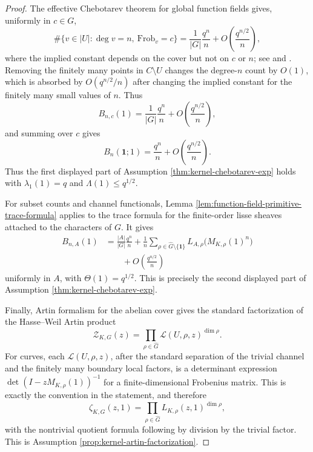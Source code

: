 \documentclass[12pt,a4paper]{article}
\theoremstyle{plain}
\theoremstyle{definition}
\numberwithin{equation}{section}
\newcommand{\ind}{\mathbf{1}}
\begin{document}
\begin{proof}
The effective Chebotarev theorem for global function fields gives, uniformly in \(c\in G\),
\[
\#\{v\in |U|:\deg v=n,\ \mathrm{Frob}_v=c\}
=
\frac{1}{|G|}\frac{q^n}{n}+O\!\left(\frac{q^{n/2}}{n}\right),
\]
where the implied constant depends on the cover but not on \(c\) or \(n\); see \cite[Chapter 9]{Rosen2002} and \cite{Ishibashi1992}. Removing the finitely many points in \(C\setminus U\) changes the degree-\(n\) count by \(O(1)\), which is absorbed by \(O(q^{n/2}/n)\) after changing the implied constant for the finitely many small values of \(n\). Thus
\[
B_{n,c}(1)
=
\frac{1}{|G|}\frac{q^n}{n}
+O\!\left(\frac{q^{n/2}}{n}\right),
\]
and summing over \(c\) gives
\[
B_n(\ind;1)
=
\frac{q^n}{n}+O\!\left(\frac{q^{n/2}}{n}\right).
\]
Thus the first displayed part of Assumption \ref{thm:kernel-chebotarev-exp} holds with \(\lambda_1(1)=q\) and \(\Lambda(1)\le q^{1/2}\).

For subset counts and channel functionals, Lemma \ref{lem:function-field-primitive-trace-formula} applies to the trace formula for the finite-order lisse sheaves attached to the characters of \(G\). It gives
\[
\begin{aligned}
B_{n,A}(1)
&=\frac{|A|}{|G|}\frac{q^n}{n}
+\frac1n\sum_{\rho\in\widehat G\setminus\{\ind\}}
L_{A,\rho}\!\bigl(M_{K,\rho}(1)^n\bigr)\\
&\qquad +O\!\left(\frac{q^{n/2}}{n}\right)
\end{aligned}
\]
uniformly in \(A\), with \(\Theta(1)=q^{1/2}\). This is precisely the second displayed part of Assumption \ref{thm:kernel-chebotarev-exp}.

Finally, Artin formalism for the abelian cover gives the standard factorization of the Hasse--Weil Artin product
\[
\mathcal Z_{K,G}(z)=\prod_{\rho\in\widehat G}\mathcal L(U,\rho,z)^{\dim\rho}.
\]
For curves, each \(\mathcal L(U,\rho,z)\), after the standard separation of the trivial channel and the finitely many boundary local factors, is a determinant expression \(\det(I-zM_{K,\rho}(1))^{-1}\) for a finite-dimensional Frobenius matrix. This is exactly the convention in the statement, and therefore
\[
\zeta_{K,G}(z,1)=\prod_{\rho\in\widehat G}L_{K,\rho}(z,1)^{\dim\rho},
\]
with the nontrivial quotient formula following by division by the trivial factor. This is Assumption \ref{prop:kernel-artin-factorization}.
\end{proof}



\end{document}
